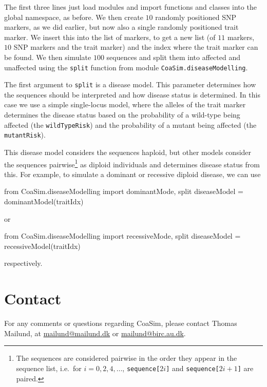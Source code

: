 \documentclass{manual}
\begin{document}
The first three lines just load modules and import functions and
classes into the global namespace, as before.  We then create $10$
randomly positioned SNP markers, as we did earlier, but now also a
single randomly positioned trait marker.  We insert this into the list
of markers, to get a new list (of $11$ markers, $10$ SNP markers and
the trait marker) and the index where the trait marker can be found.
We then simulate $100$ sequences and split them into affected and
unaffected using the \texttt{split} function from module
\texttt{CoaSim.diseaseModelling}.

The first argument to \texttt{split} is a disease model.  This
parameter determines how the sequences should be interpreted and how
disease status is determined.  In this case we use a simple
single-locus model, where the alleles of the trait marker determines
the disease status based on the probability of a wild-type being
affected (the \texttt{wildTypeRisk}) and the probability of a mutant
being affected (the \texttt{mutantRisk}).

This disease model considers the sequences haploid, but other models
consider the sequences pairwise\footnote{The sequences are considered
  pairwise in the order they appear in the sequence list, i.e.\ for
  $i=0,2,4,\ldots$, \texttt{sequence[$2i$]} and
  \texttt{sequence[$2i+1$]} are paired.} as diploid individuals and
determines disease status from this.  For example, to simulate a
dominant or recessive diploid disease, we can use
\begin{code}
from CoaSim.diseaseModelling import dominantMode, split
diseaseModel = dominantModel(traitIdx)
\end{code}
or
\begin{code}
from CoaSim.diseaseModelling import recessiveMode, split
diseaseModel = recessiveModel(traitIdx)
\end{code}
respectively.



\section{Contact}
\label{sec:contact}

For any comments or questions regarding CoaSim, please contact Thomas
Mailund, at \href{mailto:mailund@mailund.dk}{mailund@mailund.dk} or
\href{mailund@birc.au.dk}{mailund@birc.au.dk}.
\end{document}

